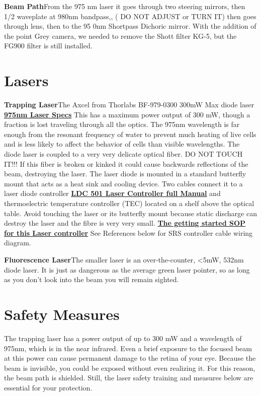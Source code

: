 \documentclass{../lab}
\begin{document}
\textbf{Beam Path}From the 975 nm laser it goes through two steering mirrors, then 1/2 waveplate at 980nm bandpass,, ( DO NOT ADJUST or TURN IT) then goes through lens, then to the 95 0nm Shortpass Dichoric mirror. With the addition of the point Grey camera, we needed to remove the Shott filter KG-5, but the FG900 filter is still installed.

\section{Lasers}

\textbf{Trapping Laser}The Axcel from Thorlabs BF-979-0300 300mW Max diode laser \href{http://experimentationlab.berkeley.edu/sites/default/files/images/975nm-Laser-Specs.pdf}{\textbf{975nm Laser Specs}} This has a maximum power output of 300 mW, though a fraction is lost traveling through all the optics. The 975nm wavelength is far enough from the resonant frequency of water to prevent much heating of live cells and is less likely to affect the behavior of cells than visible wavelengths. The diode laser is coupled to a very very delicate optical fiber. DO NOT TOUCH IT!!! If this fiber is broken or kinked it could cause backwards reflections of the beam, destroying the laser. The laser diode is mounted in a standard butterfly mount that acts as a heat sink and cooling device. Two cables connect it to a laser diode controller \href{http://experimentationlab.berkeley.edu/sites/default/files/images/LDC501m.pdf}{\textbf{LDC 501 Laser Controller full Manual}} and thermoelectric temperature controller (TEC) located on a shelf above the optical table. Avoid touching the laser or its butterfly mount because static discharge can destroy the laser and the fibre is very very small. \href{http://experimentationlab.berkeley.edu/sites/default/files/images/SOP\_Laser\_Diode\_Driver.pdf}{\textbf{The getting started SOP for this Laser controller}} See References below for SRS controller cable wiring diagram.

\textbf{Fluorescence Laser}The smaller laser is an over-the-counter, <5mW, 532nm diode laser. It is just as dangerous as the average green laser pointer, so as long as you don't look into the beam you will remain sighted.

\section{Safety Measures}

The trapping laser has a power output of up to 300 mW and a wavelength of 975nm, which is in the near infrared. Even a brief exposure to the focused beam at this power can cause permanent damage to the retina of your eye. Because the beam is invisible, you could be exposed without even realizing it. For this reason, the beam path is shielded. Still, the laser safety training and measures below are essential for your protection.
\end{document}
